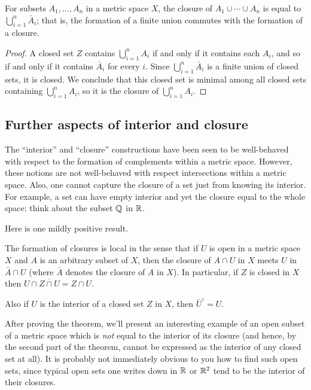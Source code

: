 \begin{corollary}
  For subsets \(A_1,\dotsc,A_n\) in a metric space \(X\), the closure of
  \(A_1\cup\dotsb\cup A_n\) is equal to \(\bigcup_{i=1}^n \bar A_i\); that
  is, the formation of a finite union commutes with the formation of a
  closure.
\end{corollary}
\begin{proof}
  A closed set \(Z\) contains \(\bigcup_{i=1}^n A_i\) if and only if it
  contains each \(A_i\), and so if and only if it contains \(\bar A_i\) for
  every \(i\). Since \(\bigcup_{i=1}^n\bar A_i\) is a finite union of
  closed sets, it is closed. We conclude that this closed set is minimal
  among all closed sets containing \(\bigcup_{i=1}^n A_i\), so it is the
  closure of \(\bigcup_{i=1}^n A_i\).
\end{proof}

\subsection{Further aspects of interior and closure}
The ``interior'' and ``closure'' constructions have been seen to be
well-behaved with respect to the formation of complements within a metric
space. However, these notions are not well-behaved with respect
intersections within a metric space. Also, one cannot capture the closure
of a set just from knowing its interior. For example, a set can have empty
interior and yet the closure equal to the whole space: think about the
subset \(\mathbb{Q}\) in \(\mathbb{R}\).

Here is one mildly positive result.
\begin{theorem}
  The formation of closures is local in the sense that if \(U\) is open in
  a metric space \(X\) and \(A\) is an arbitrary subset of \(X\), then the
  closure of \(A\cap U\) in \(X\) meets \(U\) in \(\bar A\cap U\) (where
  \(\bar A\) denotes the closure of \(A\) in \(X\)). In particular, if
  \(Z\) is closed in \(X\) then \(U\cap\overline{Z\cap U}=Z\cap U\).

  Also if \(U\) is the interior of a closed set \(Z\) in \(X\), then
  \({\bar U}^\circ=U\).
\end{theorem}

After proving the theorem, we'll present an interesting example of an open
subset of a metric space which is \emph{not} equal to the interior of its
closure (and hence, by the second part of the theorem, cannot be expressed
as the interior of any closed set at all). It is probably not immediately
obvious to you how to find such open sets, since typical open sets one
writes down in \(\mathbb{R}\) or \(\mathbb{R}^2\) tend to be the interior of their
closures.

